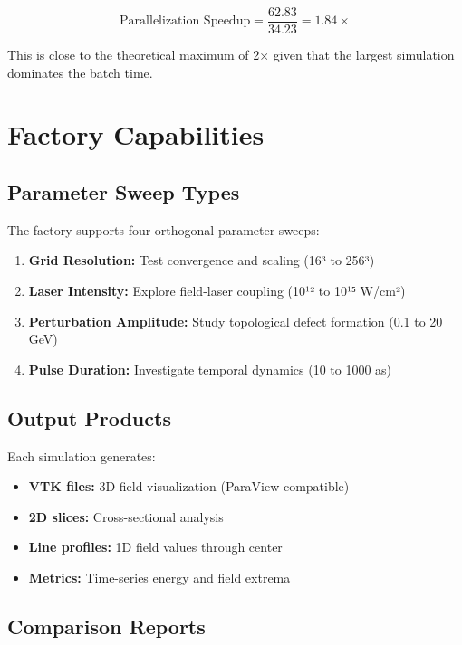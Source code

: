 \documentclass[12pt,a4paper]{article}
\begin{document}
\begin{equation}
\text{Parallelization Speedup} = \frac{62.83}{34.23} = 1.84\times
\end{equation}

This is close to the theoretical maximum of 2× given that the largest simulation dominates the batch time.

\section{Factory Capabilities}

\subsection{Parameter Sweep Types}

The factory supports four orthogonal parameter sweeps:

\begin{enumerate}
    \item \textbf{Grid Resolution:} Test convergence and scaling (16³ to 256³)
    \item \textbf{Laser Intensity:} Explore field-laser coupling (10¹² to 10¹⁵ W/cm²)
    \item \textbf{Perturbation Amplitude:} Study topological defect formation (0.1 to 20 GeV)
    \item \textbf{Pulse Duration:} Investigate temporal dynamics (10 to 1000 as)
\end{enumerate}

\subsection{Output Products}

Each simulation generates:

\begin{itemize}
    \item \textbf{VTK files:} 3D field visualization (ParaView compatible)
    \item \textbf{2D slices:} Cross-sectional analysis
    \item \textbf{Line profiles:} 1D field values through center
    \item \textbf{Metrics:} Time-series energy and field extrema
\end{itemize}

\subsection{Comparison Reports}
\end{document}
